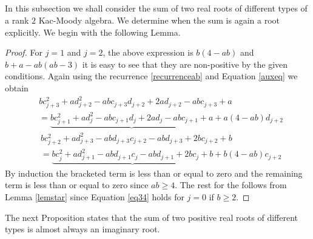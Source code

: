\documentclass[12pt,reqno]{amsart}
\theoremstyle{plain}
\newtheorem{lem}{Lemma}
\theoremstyle{definition}
\theoremstyle{remark}
\begin{document}
\subsection{} In this subsection we shall consider the sum of two real roots of different types of a rank $2$ Kac-Moody algebra. We determine when the sum is again a root explicitly. We begin with the following Lemma.

\begin{proof}
    For $j=1$ and $j=2$, the above expression is $b(4-ab)$ and $b+a-ab(ab-3)$ it is easy to see that they are non-positive by the given conditions. Again using the recurrence \ref{recurrenceab} and Equation \ref{auxeq} we obtain
    \begin{align*}
        &bc_{j+3}^2+ad_{j+2}^2-abc_{j+3}d_{j+2}+2ad_{j+2}-abc_{j+3}+a\\&=\underbrace{bc_{j+1}^2+ad_j^2-abc_{j+1}d_j+2ad_j-abc_{j+1}+a}+a(4-ab)d_{j+2}
    \end{align*}
    \begin{align*}
        &bc_{j+2}^2+ad_{j+3}^2-abd_{j+3}c_{j+2}-abd_{j+3}+2bc_{j+2}+b\\
        &=\underbrace{bc_j^2+ad_{j+1}^2-abd_{j+1}c_j-abd_{j+1}+2bc_j+b}+b(4-ab)c_{j+2}
    \end{align*}
    By induction the bracketed term is less than or equal to zero and the remaining term is less than or equal to zero since $ab\geq 4$. The rest for the follows from Lemma \ref{lemstar} since Equation \ref{eq34} holds for $j=0$ if $b\geq 2.$
\end{proof}
The next Proposition states that the sum of two positive real roots of different types is almost always an imaginary root.
\end{document}
